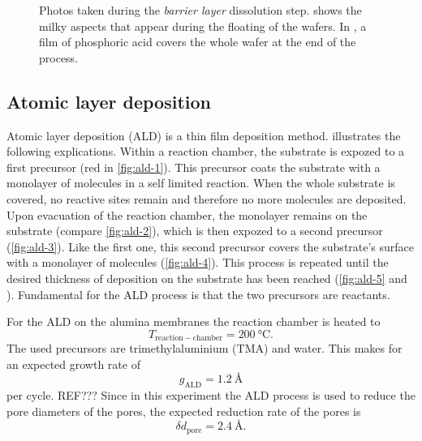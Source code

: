 \documentclass[../thesis.tex]{subfiles}
\begin{document}
\begin{figure}[p]
{            \label{fig:filmed-membrane-photo}}
            \caption{Photos taken during the \textit{barrier layer} dissolution step. \protect{} shows the milky aspects that appear during the floating of the wafers. In \protect{}, a film of phosphoric acid covers the whole wafer at the end of the process.}
            \label{fig:barrier-layer-dissolution-photos}
          \end{figure}

      \subsection{Atomic layer deposition}
      \label{subsec:ald}

        

        Atomic layer deposition (ALD) is a thin film deposition method.  illustrates the following explications. Within a reaction chamber, the substrate is expozed to a first precursor (red in \cref{fig:ald-1}). This precursor coats the substrate with a monolayer of molecules in a self limited reaction. When the whole substrate is covered, no reactive sites remain and therefore no more molecules are deposited. Upon evacuation of the reaction chamber, the monolayer remains on the substrate (compare \cref{fig:ald-2}), which is then expozed to a second precursor (\cref{fig:ald-3}). Like the first one, this second precursor covers the substrate's surface with a monolayer of molecules (\cref{fig:ald-4}). This process is repeated until the desired thickness of deposition on the substrate has been reached (\cref{fig:ald-5} and \protect{}). Fundamental for the ALD process is that the two precursors are reactants.
        \medskip

        For the ALD on the alumina membranes the reaction chamber is heated to
        \begin{equation*}
          T_\mathrm{reaction-chamber}=\SI{200}{\celsius}.
        \end{equation*}
        The used precursors are trimethylaluminium (TMA) and water. This makes for an expected growth rate of
        \begin{equation*}
          g_\mathrm{ALD}=\SI{1,2}{\angstrom}
        \end{equation*}
        per cycle. REF??? Since in this experiment the ALD process is used to reduce the pore diameters of the pores, the expected reduction rate of the pores is
        \begin{equation*}
          \delta d_\mathrm{pore}=\SI{2,4}{\angstrom}.
        \end{equation*}
\end{document}
